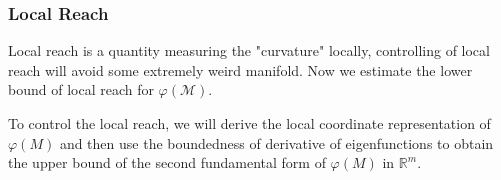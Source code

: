 \subsubsection{Local Reach}

Local reach is a quantity measuring the "curvature" locally, controlling of local reach will avoid some extremely weird manifold. Now we estimate the lower bound of local reach for $\varphi(\mathcal{M})$. 

To control the local reach, we will derive the local coordinate representation of $\varphi(M)$ and then use the boundedness of derivative of eigenfunctions to obtain the upper bound of the second fundamental form of $\varphi(M)$ in $\mathbb{R}^m$.


